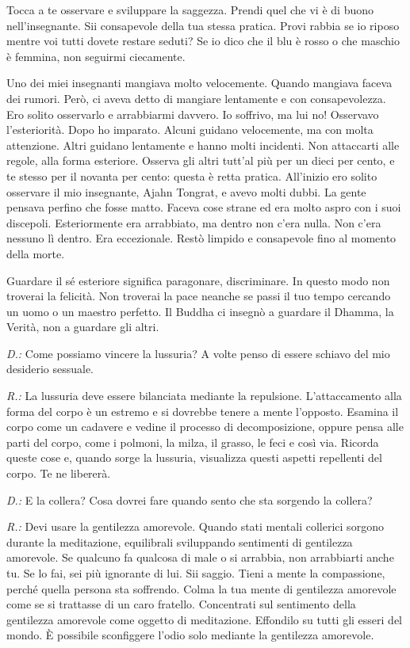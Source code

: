 Tocca a te osservare e sviluppare la saggezza. Prendi quel che vi è di
buono nell'insegnante. Sii consapevole della tua stessa pratica. Provi
rabbia se io riposo mentre voi tutti dovete restare seduti? Se io dico
che il blu è rosso o che maschio è femmina, non seguirmi ciecamente.

Uno dei miei insegnanti mangiava molto velocemente. Quando mangiava
faceva dei rumori. Però, ci aveva detto di mangiare lentamente e con
consapevolezza. Ero solito osservarlo e arrabbiarmi davvero. Io
soffrivo, ma lui no! Osservavo l'esteriorità. Dopo ho imparato. Alcuni
guidano velocemente, ma con molta attenzione. Altri guidano lentamente e
hanno molti incidenti. Non attaccarti alle regole, alla forma esteriore.
Osserva gli altri tutt'al più per un dieci per cento, e te stesso per il
novanta per cento: questa è retta pratica. All'inizio ero solito
osservare il mio insegnante, Ajahn Tongrat, e avevo molti dubbi. La
gente pensava perfino che fosse matto. Faceva cose strane ed era molto
aspro con i suoi discepoli. Esteriormente era arrabbiato, ma dentro non
c'era nulla. Non c'era nessuno lì dentro. Era eccezionale. Restò limpido
e consapevole fino al momento della morte.

Guardare il sé esteriore significa paragonare, discriminare. In questo
modo non troverai la felicità. Non troverai la pace neanche se passi il
tuo tempo cercando un uomo o un maestro perfetto. Il Buddha ci insegnò a
guardare il Dhamma, la Verità, non a guardare gli altri.

\emph{D.:} Come possiamo vincere la lussuria? A volte penso di essere schiavo
del mio desiderio sessuale.

\emph{R.:} La lussuria deve essere bilanciata mediante la repulsione.
L'attaccamento alla forma del corpo è un estremo e si dovrebbe tenere a
mente l'opposto. Esamina il corpo come un cadavere e vedine il processo
di decomposizione, oppure pensa alle parti del corpo, come i polmoni, la
milza, il grasso, le feci e così via. Ricorda queste cose e, quando
sorge la lussuria, visualizza questi aspetti repellenti del corpo. Te ne
libererà.

\emph{D.:} E la collera? Cosa dovrei fare quando sento che sta sorgendo la
collera?

\emph{R.:} Devi usare la gentilezza amorevole. Quando stati mentali collerici
sorgono durante la meditazione, equilibrali sviluppando sentimenti di
gentilezza amorevole. Se qualcuno fa qualcosa di male o si arrabbia, non
arrabbiarti anche tu. Se lo fai, sei più ignorante di lui. Sii saggio.
Tieni a mente la compassione, perché quella persona sta soffrendo. Colma
la tua mente di gentilezza amorevole come se si trattasse di un caro
fratello. Concentrati sul sentimento della gentilezza amorevole come
oggetto di meditazione. Effondilo su tutti gli esseri del mondo. È
possibile sconfiggere l'odio solo mediante la gentilezza amorevole.

